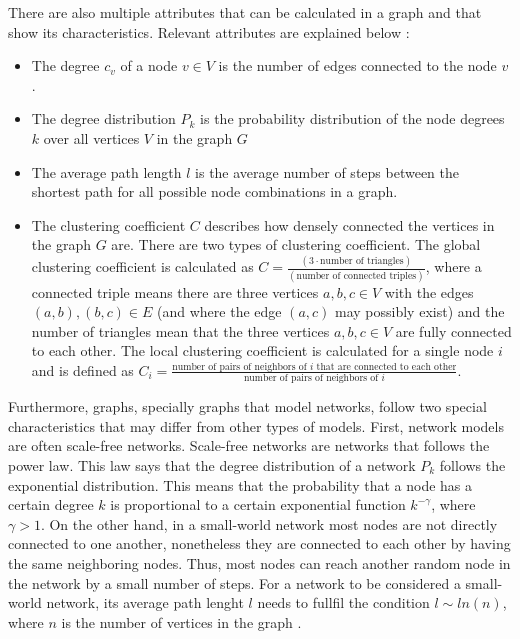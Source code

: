There are also multiple attributes that can be calculated in a graph
and that show its characteristics. Relevant attributes are 
explained below \cite{basicnetwork}:
\begin{itemize}
    \item The degree $c_v$ of a node $v \in V$ is the number of edges connected to the
    node $v$. 
    \item The degree distribution $P_k$ is the probability distribution 
    of the node degrees $k$ over all vertices $V$ in the graph $G$
    \item The average path length $l$ is the average number of steps between
    the shortest path for all possible node combinations in a graph.
    \item The clustering coefficient $C$ describes how densely connected
    the vertices in the graph $G$ are. There are two types of
    clustering coefficient. The global clustering
    coefficient is calculated as 
    $C=\frac{(3 \cdot\text{number of triangles})}{(\text{number of connected triples})}$,
    where a connected triple means there are three vertices $a,b,c\in V$ with
    the edges $(a,b), (b,c) \in E$ (and where the edge $(a,c)$ may 
    possibly exist) and the number of triangles mean
    that the three vertices $a,b,c\in V$ are fully connected to each other.
    The local clustering coefficient is calculated for a single node $i$
    and is defined as $C_i=\frac{\text{number of pairs of neighbors of }i 
    \text{ that are connected to each other}}
    {\text{number of pairs of neighbors of }i }$.
\end{itemize}

Furthermore, graphs, specially graphs that model networks, follow two special 
characteristics that may differ from other types of models.
First, network models are often scale-free networks.
Scale-free networks are networks that follows the power law.
This law says that the degree distribution of a network
$P_k$ follows the exponential distribution.
This means that the probability that a node has a certain degree $k$ 
is proportional to a certain exponential function $k^{-\gamma}$, where
$\gamma>1$.
On the other hand, in a small-world network most nodes are not directly
connected to one another, nonetheless they are connected to each other by
having the same neighboring nodes. Thus, most nodes can reach another
random node in the network by a small number of steps. For a network
to be considered a small-world network, its average path lenght $l$ 
needs to fullfil the condition $l\sim ln(n)$, where $n$ is the number
of vertices in the graph \cite{wattsmodel}.

